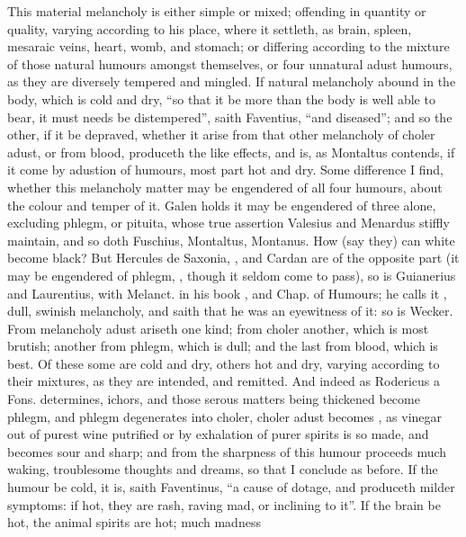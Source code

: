This material melancholy is either simple or mixed; offending in quantity or
quality, varying according to his place, where it settleth, as brain, spleen,
mesaraic veins, heart, womb, and stomach; or differing according to the mixture
of those natural humours amongst themselves, or four unnatural adust humours,
as they are diversely tempered and mingled. If natural melancholy abound in the
body, which is cold and dry, \enquote{so that it be more than the
body is well able to bear, it must needs be distempered}, saith Faventius, \enquote{and
diseased}; and so the other, if it be depraved, whether it arise from that
other melancholy of choler adust, or from blood, produceth the like effects,
and is, as Montaltus contends, if it come by adustion of humours, most part hot
and dry. Some difference I find, whether this melancholy matter may be
engendered of all four humours, about the colour and temper of it. Galen holds
it may be engendered of three alone, excluding phlegm, or pituita, whose true
assertion Valesius and Menardus stiffly maintain, and so
doth Fuschius, Montaltus, Montanus.
How (say they) can white become black? But Hercules de Saxonia,
, and
Cardan are of the opposite part (it may be engendered of
phlegm, , though it seldom come to pass), so is
Guianerius and Laurentius, 
with Melanct. in his book , and Chap. of
Humours; he calls it , dull, swinish melancholy, and saith that he
was an eyewitness of it: so is Wecker. From melancholy
adust ariseth one kind; from choler another, which is most brutish; another
from phlegm, which is dull; and the last from blood, which is best. Of these
some are cold and dry, others hot and dry, varying
according to their mixtures, as they are intended, and remitted. And indeed as
Rodericus a Fons.  determines, ichors,
and those serous matters being thickened become phlegm, and phlegm degenerates
into choler, choler adust becomes , as vinegar out
of purest wine putrified or by exhalation of purer spirits is so made, and
becomes sour and sharp; and from the sharpness of this humour proceeds much
waking, troublesome thoughts and dreams, \etc{} so that I conclude as before.
If the humour be cold, it is, saith Faventinus, \enquote{a cause
of dotage, and produceth milder symptoms: if hot, they are rash, raving mad, or
inclining to it}. If the brain be hot, the animal spirits are hot; much madness
